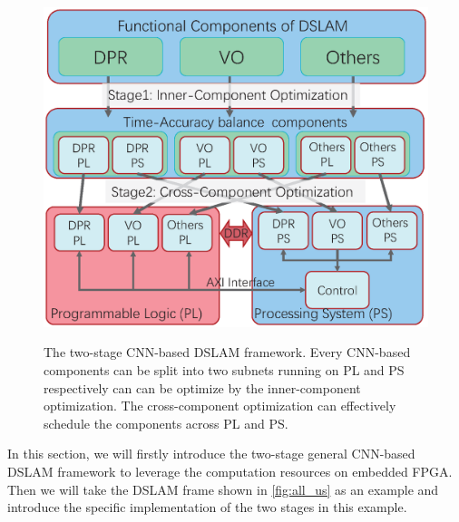 \label{sec:hardsoft}


\begin{figure}[t]  
    \centering  
    {\includegraphics[width=0.9\linewidth]{fig/framework.eps}}
    \caption{The two-stage CNN-based DSLAM framework. Every CNN-based components can be split into two subnets running on PL and PS respectively can can be optimize by the inner-component optimization. The cross-component optimization can effectively schedule the components across PL and PS.}
    \label{fig:framework}
\end{figure}

In this section, we will firstly introduce the two-stage general CNN-based DSLAM framework to leverage the computation resources on embedded FPGA. Then we will take the DSLAM frame shown in \cref{fig:all_us} as an example and introduce the specific implementation of the two stages in this example. 



